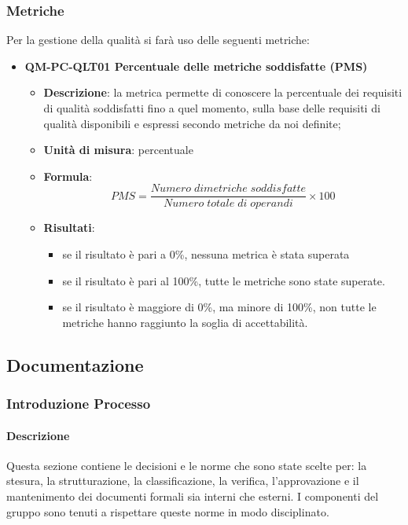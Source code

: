 		\subsubsection{Metriche}
			Per la gestione della qualità si farà uso delle seguenti metriche:
			\begin{itemize}
				\item\textbf{QM-PC-QLT01 Percentuale delle metriche soddisfatte (PMS)}
					\begin{itemize}
						\item\textbf{Descrizione}: la metrica permette di conoscere la percentuale dei requisiti di qualità soddisfatti fino a quel momento, sulla base delle requisiti di qualità disponibili e espressi secondo metriche da noi definite;
						\item\textbf{Unità di misura}: percentuale
						\item\textbf{Formula}: \\
							\[PMS = \frac{\mathit{Numero\;di metriche\;soddisfatte}}{\mathit{Numero\;totale\;di\;operandi}} \times 100\]
						\item\textbf{Risultati}: 
							\begin{itemize}
								\item se il risultato è pari a 0\%, nessuna metrica è stata superata
								\item se il risultato è pari al 100\%, tutte le metriche sono state superate.
								\item se il risultato è maggiore di 0\%, ma minore di 100\%, non tutte le metriche hanno raggiunto la soglia di accettabilità.
							\end{itemize}
					\end{itemize}
			\end{itemize}
	
	\subsection{Documentazione}
		\subsubsection{Introduzione Processo}
			\paragraph{Descrizione}
				Questa sezione contiene le decisioni e le norme che sono state scelte per: la stesura, la strutturazione, la classificazione, la verifica, l’approvazione e il mantenimento dei documenti formali sia interni che esterni. I componenti del gruppo sono tenuti a rispettare queste norme in modo disciplinato.
